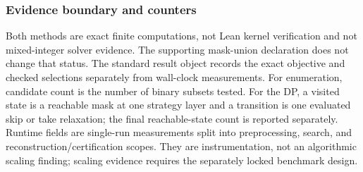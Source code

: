 \subsubsection{Evidence boundary and counters}
Both methods are exact finite computations, not Lean kernel verification and
not mixed-integer solver evidence.  The supporting mask-union declaration
does not change that status.  The standard result object records the
exact objective and checked selections separately from wall-clock
measurements.  For enumeration, candidate count is the number of binary
subsets tested.  For the DP, a visited state is a reachable mask at one
strategy layer and a transition is one evaluated skip or take relaxation;
the final reachable-state count is reported separately.  Runtime fields are
single-run measurements split into preprocessing, search, and
reconstruction/certification scopes.  They are instrumentation, not an
algorithmic scaling finding; scaling evidence requires the separately locked
benchmark design.
